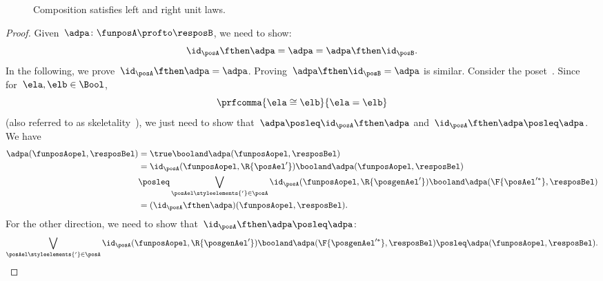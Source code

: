 \begin{figure}[h!]
    \centering
    \caption{Composition satisfies left and right unit laws.} \label{fig:compositionunital}
\end{figure}
\begin{proof}
    Given~$\adpa\colon \funposA\profto \resposB$, we need to show:
    \begin{equation*}
        \id_\posA \fthen \adpa = \adpa = \adpa \fthen \id_\posB.
    \end{equation*}
    In the following, we prove~$\id_\posA \fthen \adpa = \adpa$.
    Proving~$\adpa\fthen \id_\posB=\adpa$ is similar.
    Consider the poset~\Bool.
    Since for~$\ela,\elb\in \Bool$,
    \begin{equation*}
        \prfcomma{
            \ela\cong \elb
        }{
            \ela=\elb
        }
    \end{equation*}
    (also referred to as skeletality~\cite{fong2019}), we just need to show that~$\adpa\posleq \id_\posA\fthen \adpa$ and~$\id_\posA\fthen \adpa\posleq \adpa$.
    We have
    \begin{equation*}
        \label{eq:dp_unit_1}
        \begin{aligned}
            \adpa(\funposAopel,\resposBel) & =\true \booland \adpa(\funposAopel,\resposBel)                                                                                       \\
                                           & = \id_\posA(\funposAopel,\R{\posAel'}) \booland \adpa(\funposAopel,\resposBel)                                                       \\
                                           & \posleq \bigvee_{\posAel\styleelements{'} \in \posA}\id_\posA(\funposAopel,\R{\posgenAel'})\booland \adpa(\F{\posAel'^*},\resposBel) \\
                                           & =(\id_\posA\fthen \adpa)(\funposAopel,\resposBel).
        \end{aligned}
    \end{equation*}
    For the other direction, we need to show that~$\id_\posA\fthen \adpa\posleq \adpa$:
    \begin{equation*}
        \label{eq:dp_unit_2}
        \bigvee_{\posAel\styleelements{'}\in \posA}\id_\posA(\funposAopel,\R{\posgenAel'})\booland \adpa(\F{\posgenAel'^*},\resposBel) \posleq \adpa(\funposAopel,\resposBel).
    \end{equation*}

\end{proof}
